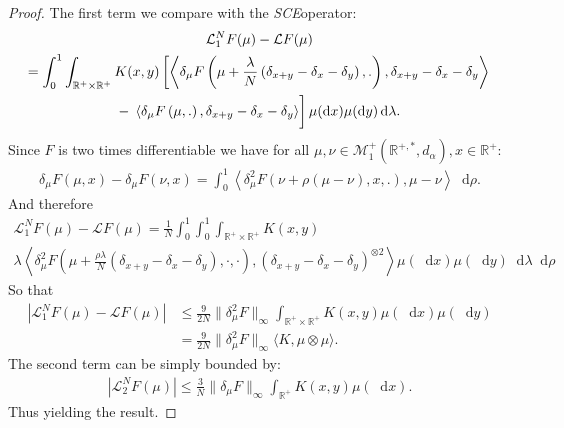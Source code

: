 \documentclass[11pt,a4paper]{article}
\newcommand{\RR}{\mathbb{R}}
\newcommand{\MC}{\mathcal{M}}
\newcommand{\LC}{\mathcal{L}}
\newcommand{\SCE}{{\emph{SCE}}}
\newcommand{\dd}{\mathop{}\!\mathrm{d}}
\begin{document}
\begin{proof}
    The first term we compare with the \SCE operator:
    \begin{multline*}
        \LC_1^N F(\mu) - \LC F(\mu) \\
        = \int_0^1 \int_{\RR^+ \times \RR^+} K(x,y)\left[ \left\langle  \delta_\mu F\left(\mu + \frac{\lambda}{N}\left(\delta_{x + y} - \delta_x - \delta_y \right),.\right),\delta_{x+y} - \delta_x - \delta_y\right\rangle  \right.\\
        -\left.\vphantom{\left\langle  \delta_\mu F\left(\mu + \frac{\lambda}{N}\left(\delta_{x + y} - \delta_x - \delta_y \right),.\right),\delta_{x+y} - \delta_x - \delta_y\right\rangle}
        \left\langle  \delta_\mu F\left(\mu,.\right),\delta_{x+y} - \delta_x - \delta_y\right\rangle\right]\mu(\dd x)\mu(\dd y)\dd\lambda .
    \end{multline*}
    Since $F$ is two times differentiable we have for all $\mu,\nu \in \MC^+_1\left(\RR^{+,*},d_\alpha\right) , x \in \RR^+$:
    \begin{align*}
        \delta_\mu F\left(\mu,x \right) - \delta_\mu F\left(\nu,x \right)
        = \int_0^1 \left\langle\delta^2_\mu F\left(\nu + \rho\left(\mu - \nu \right),x,. \right),\mu - \nu  \right\rangle \dd\rho .
    \end{align*}
    And therefore
    \begin{multline*}
        \LC_1^N F(\mu) - \LC F(\mu) 
        = \frac{1}{N}\int_0^1 \int_0^1 \int_{\RR^+ \times \RR^+} K(x,y) \\
        \lambda\left\langle  \delta^2_\mu F\left(\mu + \frac{\rho\lambda}{N}\left(\delta_{x + y} - \delta_x - \delta_y \right),\cdot,\cdot\right),\left(\delta_{x+y} - \delta_x - \delta_y\right)^{\otimes 2}\right\rangle \mu(\dd x)\mu(\dd y)\dd \lambda \dd \rho 
    \end{multline*}
    So that
    \begin{align*}
        \left| \LC_1^N F(\mu) - \LC F(\mu) \right| 
        &\leq \frac{9}{2N}\|\delta_\mu^2 F\|_{\infty} \int_{\RR^+ \times \RR^+} K(x,y)\mu(\dd x)\mu(\dd y)\\
        &= \frac{9}{2N}\|\delta_\mu^2 F\|_{\infty}\langle K,\mu\otimes\mu\rangle.
    \end{align*}
    The second term can be simply bounded by:
    \begin{align*}
        \left|\LC_2^N F(\mu) \right| \leq \frac{3}{N}\|\delta_\mu F\|_{\infty}\int_{\RR^+} K(x,y)\mu(\dd x).
    \end{align*}
    Thus yielding the result.
\end{proof}
\end{document}
